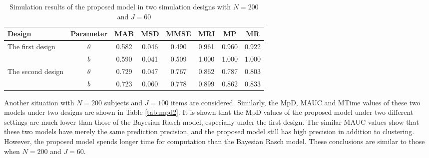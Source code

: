 \documentclass[12pt]{article}
\begin{document}
\begin{table}[h!]
	\centering
	\caption{Simulation results of the proposed model in two simulation designs with $N=200$ and $J=60$}\label{tab:simu}
	\begin{tabular}{lccccccc}
		\toprule
		Design & Parameter& MAB & MSD &MMSE & MRI & MP & MR\\
		\midrule 
		\multirow{2}{*}{The first design} & $\theta$ &  0.582 & 0.046  & 0.490  & 0.961 & 0.960 & 0.922 \\
		& $b$ & 0.590 & 0.041 & 0.509 & 1.000  & 1.000 & 1.000 \\
		\multirow{2}{*}{The second design}  &$\theta$ &  0.729 & 0.047 & 0.767  & 0.862 & 0.787 & 0.803\\
		& $b$ & 0.723 & 0.060 & 0.778 & 0.899 & 0.862 & 0.833 \\
		\bottomrule
	\end{tabular}
\end{table} 

%

Another situation with $N=200$ subjects and $J=100$ items are considered. Similarly, the MpD, MAUC and MTime values of these two models under two designs are shown in Table \ref{tab:mpd2}. It is shown that the MpD values of the proposed model under two different settings are much lower than those of the Bayesian Rasch model, especially under the first design. The similar MAUC values show that these two models have merely the same prediction precision, and the proposed model still has high precision in addition to clustering. However, the proposed model spends longer time for computation than the Bayesian Rasch model. These conclusions are similar to those when $N=200$ and $J=60$. 
\end{document}
